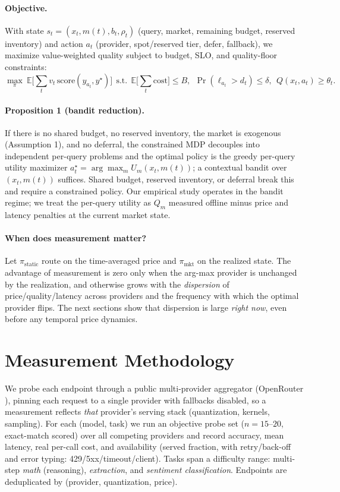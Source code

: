\documentclass{article}
\begin{document}
\paragraph{Objective.} With state $s_t=(x_t,m(t),b_t,\rho_t)$ (query, market, remaining budget,
reserved inventory) and action $a_t$ (provider, spot/reserved tier, defer, fallback), we
maximize value-weighted quality subject to budget, SLO, and quality-floor constraints:
\[
\max_\pi\ \mathbb{E}\Big[\textstyle\sum_t v_t\,\mathrm{score}(y_{a_t},y^\star)\Big]
\ \ \text{s.t.}\ \ \mathbb{E}\big[\textstyle\sum_t \mathrm{cost}\big]\le B,\ \
\Pr(\ell_{a_t}\!>d_t)\le\delta,\ \ Q(x_t,a_t)\ge\theta_t.
\]

\paragraph{Proposition 1 (bandit reduction).} If there is no shared budget, no reserved
inventory, the market is exogenous (Assumption 1), and no deferral, the constrained MDP
decouples into independent per-query problems and the optimal policy is the greedy per-query
utility maximizer $a_t^\star=\arg\max_m U_m(x_t,m(t))$; a contextual bandit over
$(x_t,m(t))$ suffices. Shared budget, reserved inventory, or deferral break this and require a
constrained policy. Our empirical study operates in the bandit regime; we treat the per-query
utility as $Q_m$ measured offline minus price and latency penalties at the current market state.

\paragraph{When does measurement matter?} Let $\pi_{\text{static}}$ route on the time-averaged
price and $\pi_{\text{mkt}}$ on the realized state. The advantage of measurement is zero only
when the arg-max provider is unchanged by the realization, and otherwise grows with the
\emph{dispersion} of price/quality/latency across providers and the frequency with which the
optimal provider flips. The next sections show that dispersion is large \emph{right now}, even
before any temporal price dynamics.

\section{Measurement Methodology}\label{sec:meas}
We probe each endpoint through a public multi-provider aggregator (OpenRouter
\citep{openrouter}), pinning each request to a single provider with fallbacks disabled, so a
measurement reflects \emph{that} provider's serving stack (quantization, kernels, sampling).
For each (model, task) we run an objective probe set ($n{=}15$--$20$, exact-match scored) over
all competing providers and record accuracy, mean latency, real per-call cost, and availability
(served fraction, with retry/back-off and error typing: 429/5xx/timeout/client). Tasks span a
difficulty range: multi-step \emph{math} (reasoning), \emph{extraction}, and \emph{sentiment
classification}. Endpoints are deduplicated by (provider, quantization, price).
\end{document}
